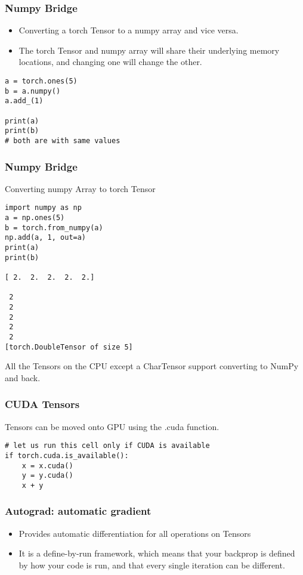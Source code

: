 \begin{frame}[fragile] \frametitle{Numpy Bridge}
\begin{itemize}
\item Converting a torch Tensor to a numpy array and vice versa. 
\item The torch Tensor and numpy array will share their underlying memory locations, and changing one will change the other.
\end{itemize}

\begin{lstlisting}
a = torch.ones(5)
b = a.numpy()
a.add_(1)

print(a)
print(b)
# both are with same values
\end{lstlisting}
\end{frame}

\begin{frame}[fragile] \frametitle{Numpy Bridge}
Converting numpy Array to torch Tensor

\begin{lstlisting}
import numpy as np
a = np.ones(5)
b = torch.from_numpy(a)
np.add(a, 1, out=a)
print(a)
print(b)

[ 2.  2.  2.  2.  2.]

 2
 2
 2
 2
 2
[torch.DoubleTensor of size 5]
\end{lstlisting}
All the Tensors on the CPU except a CharTensor support converting to NumPy and back.
\end{frame}

\begin{frame}[fragile] \frametitle{CUDA Tensors}
Tensors can be moved onto GPU using the .cuda function.

\begin{lstlisting}
# let us run this cell only if CUDA is available
if torch.cuda.is_available():
    x = x.cuda()
    y = y.cuda()
    x + y

\end{lstlisting}
\end{frame}

\begin{frame}[fragile] \frametitle{Autograd: automatic gradient}
\begin{itemize}
\item Provides automatic differentiation for all operations on Tensors
\item It is a define-by-run framework, which means that your backprop is defined by how your code is run, and that every single iteration can be different.
\end{itemize}
\end{frame}

